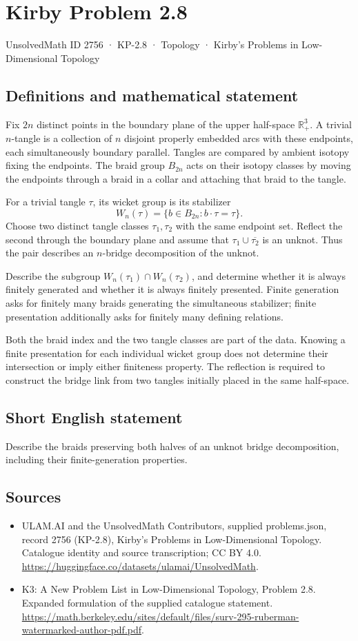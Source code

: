 \documentclass[11pt,a4paper]{article}
\begin{document}
\section*{Kirby Problem 2.8}\label{2756}
{\small UnsolvedMath ID 2756 · KP-2.8 · Topology · Kirby's Problems in Low-Dimensional Topology}
\subsection{Definitions and mathematical statement}
Fix $2n$ distinct points in the boundary plane of the upper half-space $\mathbb R^3_+$. A trivial $n$-tangle is a collection of $n$ disjoint properly embedded arcs with these endpoints, each simultaneously boundary parallel. Tangles are compared by ambient isotopy fixing the endpoints. The braid group $B_{2n}$ acts on their isotopy classes by moving the endpoints through a braid in a collar and attaching that braid to the tangle.

For a trivial tangle $\tau$, its wicket group is its stabilizer
\[
W_n(\tau)=\{b\in B_{2n}:b\cdot\tau=\tau\}.
\]
Choose two distinct tangle classes $\tau_1,\tau_2$ with the same endpoint set. Reflect the second through the boundary plane and assume that $\tau_1\cup\overline{\tau_2}$ is an unknot. Thus the pair describes an $n$-bridge decomposition of the unknot.

Describe the subgroup $W_n(\tau_1)\cap W_n(\tau_2)$, and determine whether it is always finitely generated and whether it is always finitely presented. Finite generation asks for finitely many braids generating the simultaneous stabilizer; finite presentation additionally asks for finitely many defining relations.

Both the braid index and the two tangle classes are part of the data. Knowing a finite presentation for each individual wicket group does not determine their intersection or imply either finiteness property. The reflection is required to construct the bridge link from two tangles initially placed in the same half-space.
\subsection{Short English statement}
Describe the braids preserving both halves of an unknot bridge decomposition, including their finite-generation properties.
\subsection{Sources}
\begin{itemize}
\item[S1] ULAM.AI and the UnsolvedMath Contributors, supplied problems.json, record 2756 (KP-2.8), Kirby's Problems in Low-Dimensional Topology. Catalogue identity and source transcription; CC BY 4.0.
\url{https://huggingface.co/datasets/ulamai/UnsolvedMath}.
\item[S2] K3: A New Problem List in Low-Dimensional Topology, Problem 2.8. Expanded formulation of the supplied catalogue statement.
\url{https://math.berkeley.edu/sites/default/files/surv-295-ruberman-watermarked-author-pdf.pdf}.
\end{itemize}
\end{document}
